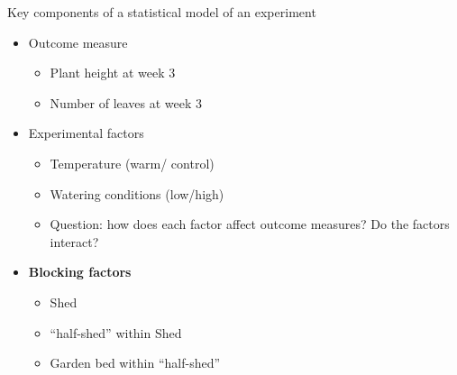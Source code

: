 \documentclass[10pt]{beamer}
\begin{document}
\begin{frame}{Key components of a statistical model of an experiment}
 \begin{itemize}
  \item Outcome measure
  \begin{itemize}
   \item Plant height at week 3
    \item Number of leaves at week 3
  \end{itemize}
  \item Experimental factors 
  \begin{itemize}
   \item Temperature (warm/ control)
    \item Watering conditions (low/high) 
    \item Question: how does each factor affect outcome measures? Do the factors interact?
  \end{itemize}
  \item \textbf{Blocking factors}
  \begin{itemize}
   \item Shed
    \item “half-shed” within Shed
    \item Garden bed within “half-shed”
  \end{itemize}
\end{itemize}
\end{frame}
\end{document}
